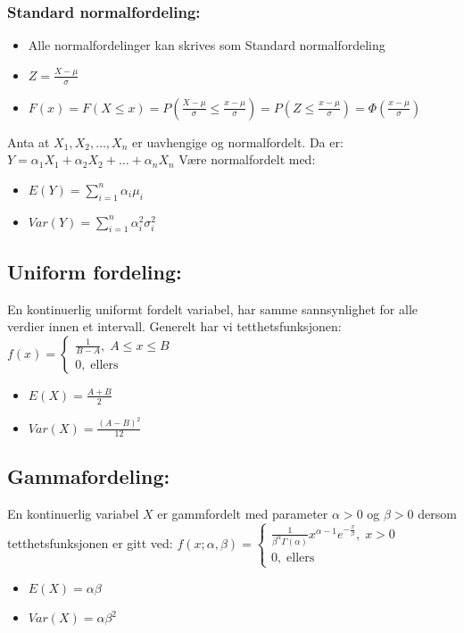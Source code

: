 \documentclass[8pt,a4paper,twocolumn,twoside]{article}
\begin{document}
\subsubsection*{Standard normalfordeling:}
\begin{itemize}[topsep=0pt,itemsep=0pt, partopsep=0pt]
    \item Alle normalfordelinger kan skrives som Standard normalfordeling
    \item $Z=\frac{X-\mu}{\sigma}$
    \item $F(x)=F(X\leq x) = P\left(\frac{X-\mu}{\sigma}\leq\frac{x-\mu}{\sigma}\right)=P\left( Z\leq \frac{x-\mu}{\sigma} \right)=\Phi\left(\frac{x-\mu}{\sigma}\right)$ 
\end{itemize}
Anta at $X_1,X_2,\dots,X_n$ er uavhengige og normalfordelt. Da er:
$Y=\alpha_1 X_1+\alpha_2 X_2+\dots+\alpha_n X_n$
Være normalfordelt med:
\begin{itemize}[topsep=0pt,itemsep=0pt, partopsep=0pt]
    \item $E(Y)=\sum_{i=1}^n \alpha_i \mu_i$
    \item $Var(Y)=\sum_{i=1}^n \alpha^2_i\sigma^2_i$
\end{itemize}
%
%
\subsection*{Uniform fordeling:}
En kontinuerlig uniformt fordelt variabel, har samme sannsynlighet for alle
verdier innen et intervall. Generelt har vi tetthetsfunksjonen:
$f(x)=\begin{cases}
    \frac{1}{B-A},\; A\leq x\leq B\\
    0,\; \text{ellers}
\end{cases}$
\begin{itemize}[topsep=0pt,itemsep=0pt, partopsep=0pt]
    \item $E(X)=\frac{A+B}{2}$
    \item $Var(X)=\frac{(A-B)^2}{12}$
\end{itemize}
\subsection*{Gammafordeling:}
En kontinuerlig variabel $X$ er gammfordelt med parameter $\alpha>0$ og $\beta>0$
dersom tetthetsfunksjonen er gitt ved:
$f(x;\alpha,\beta) = \begin{cases}
    \frac{1}{\beta^\alpha \Gamma(\alpha)} x^{\alpha-1} e^{-\frac{x}{\beta}},\; x>0\\
    0,\;\text{ellers}
\end{cases}$
\begin{itemize}[topsep=0pt,itemsep=0pt, partopsep=0pt]
    \item $E(X)=\alpha\beta$
    \item $Var(X)=\alpha\beta^2$
\end{itemize}
\end{document}
